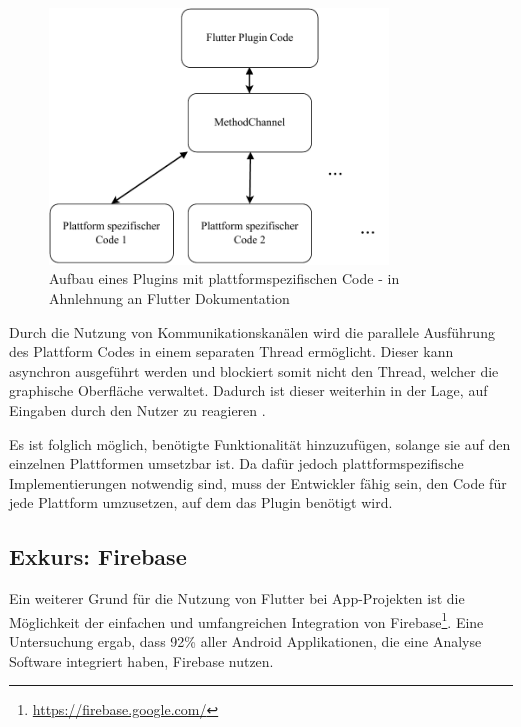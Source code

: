 \begin{figure}[ht]
  \centering
  \includegraphics[width=9cm,keepaspectratio]{images/flutter_plattform_specific.pdf} 
  \caption[Aufbau eines Plugins mit plattformspezifischen Code]{Aufbau eines Plugins mit plattformspezifischen Code - in Ahnlehnung an Flutter Dokumentation\protect\footnotemark}
  \label{fig:flutter_plattform_specific}
\end{figure}


Durch die Nutzung von Kommunikationskanälen wird die parallele Ausführung des Plattform Codes in einem separaten Thread ermöglicht. Dieser kann asynchron ausgeführt werden und blockiert somit nicht den Thread, welcher die graphische Oberfläche verwaltet. Dadurch ist dieser weiterhin in der Lage, auf Eingaben durch den Nutzer zu reagieren \cite{plattform_code_flutter}.

Es ist folglich möglich, benötigte Funktionalität hinzuzufügen, solange sie auf den einzelnen Plattformen umsetzbar ist. Da dafür jedoch plattformspezifische Implementierungen notwendig sind, muss der Entwickler fähig sein, den Code für jede Plattform umzusetzen, auf dem das Plugin benötigt wird.

\subsection{Exkurs: Firebase}
Ein weiterer Grund für die Nutzung von Flutter bei App-Projekten ist die Möglichkeit der einfachen und umfangreichen Integration von Firebase\footnote{\url{https://firebase.google.com/}}. Eine Untersuchung \cite{statist_analytics_SDK} ergab, dass 92\% aller Android Applikationen, die eine Analyse Software integriert haben, Firebase nutzen.

